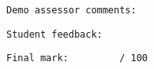 \documentclass[11pt,a4paper]{report}
\begin{document}
\vskip35pt

\begin{verbatim}Demo assessor comments:\end{verbatim}

\vskip100pt

\begin{verbatim}Student feedback:\end{verbatim}

\vskip100pt

\begin{verbatim}Final mark:         / 100\end{verbatim}
\end{document}
